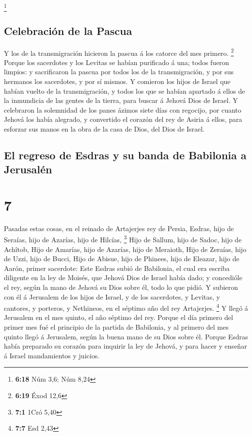 \footnote{\textbf{6:18} Núm 3,6; Núm 8,24}

\hypertarget{celebraciuxf3n-de-la-pascua}{%
\subsection{Celebración de la
Pascua}\label{celebraciuxf3n-de-la-pascua}}

 Y los de la transmigración hicieron la pascua á los
catorce del mes primero. \footnote{\textbf{6:19} Éxod 12,6}
 Porque los sacerdotes y los Levitas se habían purificado
á una; todos fueron limpios: y sacrificaron la pascua por todos los de
la transmigración, y por sus hermanos los sacerdotes, y por sí mismos.
 Y comieron los hijos de Israel que habían vuelto de la
transmigración, y todos los que se habían apartado á ellos de la
inmundicia de las gentes de la tierra, para buscar á Jehová Dios de
Israel.  Y celebraron la solemnidad de los panes ázimos
siete días con regocijo, por cuanto Jehová los había alegrado, y
convertido el corazón del rey de Asiria á ellos, para esforzar sus manos
en la obra de la casa de Dios, del Dios de Israel.

\hypertarget{el-regreso-de-esdras-y-su-banda-de-babilonia-a-jerusaluxe9n}{%
\subsection{El regreso de Esdras y su banda de Babilonia a
Jerusalén}\label{el-regreso-de-esdras-y-su-banda-de-babilonia-a-jerusaluxe9n}}

\hypertarget{section-6}{%
\section{7}\label{section-6}}

 Pasadas estas cosas, en el reinado de Artajerjes rey de
Persia, Esdras, hijo de Seraías, hijo de Azarías, hijo de Hilcías,
\footnote{\textbf{7:1} 1Cró 5,40}  Hijo de Sallum, hijo de
Sadoc, hijo de Achîtob,  Hijo de Amarías, hijo de Azarías,
hijo de Meraioth,  Hijo de Zeraías, hijo de Uzzi, hijo de
Bucci,  Hijo de Abisue, hijo de Phinees, hijo de Eleazar,
hijo de Aarón, primer sacerdote:  Este Esdras subió de
Babilonia, el cual era escriba diligente en la ley de Moisés, que Jehová
Dios de Israel había dado; y concedióle el rey, según la mano de Jehová
su Dios sobre él, todo lo que pidió.  Y subieron con él á
Jerusalem de los hijos de Israel, y de los sacerdotes, y Levitas, y
cantores, y porteros, y Nethineos, en el séptimo año del rey Artajerjes.
\footnote{\textbf{7:7} Esd 2,43}  Y llegó á Jerusalem en
el mes quinto, el año séptimo del rey.  Porque el día
primero del primer mes fué el principio de la partida de Babilonia, y al
primero del mes quinto llegó á Jerusalem, según la buena mano de su Dios
sobre él.  Porque Esdras había preparado su corazón para
inquirir la ley de Jehová, y para hacer y enseñar á Israel mandamientos
y juicios.

